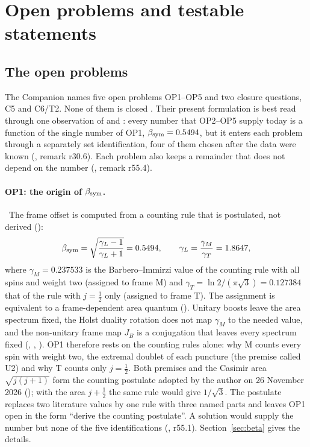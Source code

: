 \section{Open problems and testable statements}
\label{sec:open}

\subsection{The open problems}
\label{sec:open-problems}

The Companion names five open problems OP1--OP5 and two closure questions, C5 and C6/T2. None of them is closed
\cite{QSC}. Their present formulation is best read through one observation of  and : every number that
OP2--OP5 supply today is a function of the single number of OP1, $\beta_{\mathrm{sym}}=0.5494$, but it enters each problem through a
separately set identification, four of them chosen after the data were known (, remark r30.6). Each problem
also keeps a remainder that does not depend on the number (, remark r55.4).

\paragraph{OP1: the origin of $\beta_{\mathrm{sym}}$.} \Open\ The frame offset is computed from a counting rule that is postulated, not derived ():
\begin{equation}
\beta_{\mathrm{sym}}=\sqrt{\frac{\gamma_L-1}{\gamma_L+1}}=0.5494,\qquad \gamma_L=\frac{\gamma_M}{\gamma_T}=1.8647,
\label{eq:open-beta}
\end{equation}
where $\gamma_M=0.237533$ is the
Barbero--Immirzi value of the counting rule with all spins and weight two (assigned to frame M) and
$\gamma_T=\ln2/(\pi\sqrt3)=0.127384$ that of the rule with $j=\tfrac12$ only (assigned to frame T). The assignment is
equivalent to a frame-dependent area quantum (). Unitary boosts leave the area spectrum fixed, the Holst duality
rotation does not map $\gamma_M$ to the needed value, and the non-unitary frame map $J_B$ is a conjugation that leaves every
spectrum fixed (, , ). OP1 therefore rests on the counting rules alone: why M counts every spin with
weight two, the extremal doublet of each puncture (the premise called U2) and why T counts only $j=\tfrac12$. Both premises and the Casimir area $\sqrt{j(j+1)}$ form the counting postulate adopted by the author on 26 November 2026 ();
with the area $j+\tfrac12$ the same rule would give $1/\sqrt3$. The postulate replaces two literature values by one rule with three named
parts and leaves OP1 open in the form ``derive the counting postulate''. A solution would supply the
number but none of the five identifications (, r55.1). Section~\ref{sec:beta} gives the details.

